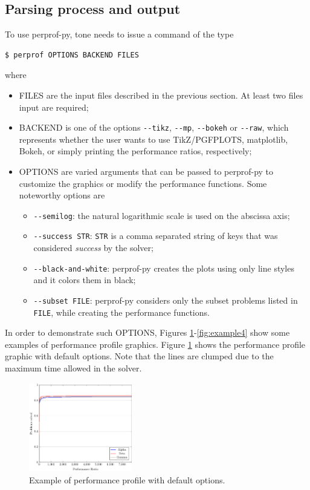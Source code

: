 \subsection*{Parsing process and output}

    To use perprof-py, tone needs to issue a command of the type
\begin{verbatim}
$ perprof OPTIONS BACKEND FILES
\end{verbatim}
    where
    \begin{itemize}
      \item FILES are the input files described in the previous section. At
        least two files input are required;
      \item BACKEND is one of the options \verb+--tikz+, \verb+--mp+,
        \verb+--bokeh+ or
        \verb+--raw+, which represents whether the user wants to use
        TikZ/PGFPLOTS, matplotlib, Bokeh, or simply printing the performance
        ratios, respectively;
      \item OPTIONS are varied arguments that can be passed to perprof-py to
        customize the graphics or modify the performance functions. Some
        noteworthy options are
        \begin{itemize}
          \item \verb+--semilog+: the natural logarithmic scale is used on the
          abscissa axis;
          \item \verb+--success STR+: \verb+STR+ is a comma separated string
            of keys that was considered  \emph{success} by the solver;
          \item \verb+--black-and-white+: perprof-py creates the plots using
            only line styles and it colors them in black;
          \item \verb+--subset FILE+: perprof-py considers only the subset problems listed in \verb+FILE+, while creating the performance functions.
        \end{itemize}
    \end{itemize}
    In order to demonstrate such OPTIONS, Figures
    \ref{fig:example1}-\ref{fig:example4} show some examples of  performance
    profile graphics.
    Figure \ref{fig:example1} shows the performance profile graphic with default
    options. Note that the lines are clumped due to the maximum time allowed
    in the solver.
    \begin{figure}[!ht]
      \centering
      \includegraphics[width=0.4\textwidth]{plots/abc.pdf}
      \caption{Example of performance profile with default options.}
      \label{fig:example1}
    \end{figure}
